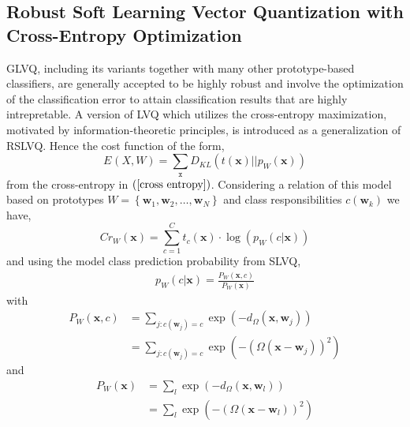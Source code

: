 \documentclass[english]{HSMW-Thesis}
\begin{document}
\subsection{Robust Soft Learning Vector Quantization  with Cross-Entropy Optimization}
GLVQ, including its variants together with many other prototype-based classifiers, are generally accepted to be highly robust and involve the optimization of the classification error to attain classification results that are highly intrepretable\cite{kaden2014aspects}. A version of LVQ which utilizes the cross-entropy maximization, motivated by information-theoretic principles, is introduced as a generalization of RSLVQ\cite{villmann2018probabilistic}. 
Hence the cost function of the form,
\begin{equation*}%
	E_{}\left( X,W\right) =\sum_{\mathtt{x}}D_{KL}\left( t\left( \mathbf{x}\right) ||p_{W}\left(\mathbf {x}\right) \right) 
\end{equation*}
from the cross-entropy in $\left(\ref{cross entropy}\right) $. Considering a relation of this model based on prototypes\hspace{2pt} $W=\left\lbrace \mathbf{w}_{1},\mathbf{w}_{2},\ldots,\mathbf{w}_{N}\right\rbrace $ \hspace{2pt}and class responsibilities\hspace{2pt} $c\left( \mathbf{w}_{k}\right)$\hspace{2pt} we have,
\begin{equation*}%
	Cr_{W}\left( \mathbf{x}\right) =\sum_{c=1}^{C}t_{c}\left( \mathbf{x}\right) \cdot\log\left( p_{W}\left(c|\mathbf{x}\right) \right)  
\end{equation*}
 and using the  model class prediction probability from SLVQ,
\begin{align*}
	p_{W}\left( c|\mathbf{x}\right)=\frac{P_{W}\left( \mathbf{x},c\right) }{P_{W}\left( \mathbf{x}\right) }
\end{align*}
with
\begin{align*}
	P_{W}\left( \mathbf{x},c\right) &= \sum_{j:c\left( \mathbf{w}_{j}\right) = c}\exp\left( -d_{\Omega}\left( \mathbf{x},\mathbf{w}_{j}\right) \right)\\
	&= \sum_{j:c\left( \mathbf{w}_{j}\right) = c}\exp\left(-\left( \Omega\left( \mathbf{x}- \mathbf{w}_{j}\right)\right) ^2 \right)
\end{align*}
and 
\begin{align*}
	P_{W}\left( \mathbf{x}\right) &= \sum_{l}\exp\left( -d_{\Omega}\left( \mathbf{x},\mathbf{w}_{l}\right) \right)\\
	&=\sum_{l}\exp\left(-\left( \Omega\left( \mathbf{x}- \mathbf{w}_{l}\right)\right) ^2 \right)
\end{align*}
\end{document}
